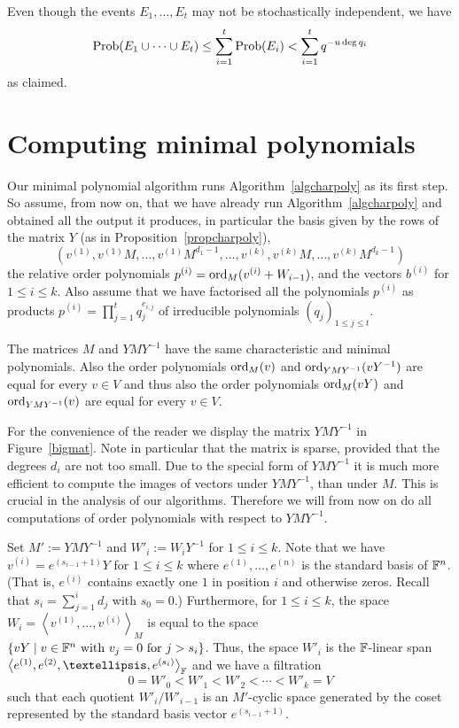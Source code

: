 Even though
the events $E_1,\ldots,E_t$ may not be stochastically independent, we have
\[ \mathrm{Prob}( E_1 \cup \cdots \cup E_t ) \le \sum_{i=1}^t \mathrm{Prob}(E_i)
   < \sum_{i=1}^t q^{-u\deg q_i} \]
as claimed.
\proofend

\section{Computing minimal polynomials}
\label{minpoly}

Our minimal polynomial algorithm runs Algorithm~\ref{algcharpoly} as its
first step. So assume, from now on,
that we have already run Algorithm~\ref{algcharpoly}
and obtained all the output it produces, in particular
the basis given by the rows of the matrix $Y$ (as in Proposition~\ref{propcharpoly}),
\[ 
(v^{(1)}, v^{(1)}M, \ldots, v^{(1)} M^{d_1-1}, \ldots, v^{(k)}, 
v^{(k)} M, \ldots, v^{(k)} M^{d_k-1}) 
\]
the relative order polynomials $p^{(i)} = \mathrm{ord}_M(v^{(i)}
+ W_{i-1})$, and the vectors $b^{(i)}$ for $1 \le i \le k$.
Also assume that we have factorised all the polynomials $p^{(i)}$
as products $p^{(i)} = \prod_{j=1}^t q_j^{e_{i,j}}$ of irreducible 
polynomials $(q_j)_{1 \le j \le t}$.

The matrices $M$ and $YMY^{-1}$ have the same characteristic
and minimal polynomials. Also the order polynomials $\mathrm{ord}_M(v)$ and
$\mathrm{ord}_{YMY^{-1}}(vY^{-1})$ are equal for every $v \in V$ and thus also
the order polynomials $\mathrm{ord}_M(vY)$ and $\mathrm{ord}_{YMY^{-1}}(v)$ are equal for every
$v \in V$.

For the convenience of the reader we display the matrix
$YMY^{-1}$ in Figure~\ref{bigmat}. Note in particular that the matrix is
sparse, provided that the degrees $d_i$ are not too small.
Due to the special form of $YMY^{-1}$ it is much more efficient to compute
the images of vectors under $YMY^{-1}$, than under $M$. 
This is crucial in the analysis of our algorithms. 
Therefore we will from now on do all computations of order polynomials
with respect to $YMY^{-1}$.

Set $M' := YMY^{-1}$ and $W'_i := W_i Y^{-1}$ for $1 \le i \le k$.
Note that we have $v^{(i)} = e^{(s_{i-1}+1)} Y$ for $1 \le i \le k$
where $e^{(1)}, \ldots, e^{(n)}$ is the standard basis of $\mathbb{F}^n$. (That is,  
 $e^{(i)}$ contains exactly one $1$ in position $i$ and otherwise zeros. Recall
that $s_i = \sum_{j=1}^i d_j$ with $s_0 = 0$.) Furthermore, for $1 \le i \le k$,
the space $W_i = \left< v^{(1)}, \ldots, v^{(i)} \right>_M$ is equal to the space
$\{ vY \mid v \in \mathbb{F}^n \mbox{ with } v_j = 0 \mbox{ for } j > s_i \}$. 
Thus, the space $W'_i$ is the $\mathbb{F}$-linear
span $\left< e^{(1)}, e^{(2)}, \ldots, e^{(s_i)}\right>_\F$ and we have a
filtration
\[ 0 = W'_0 < W'_1 < W'_2 < \cdots < W'_k = V \]
such that each quotient $W'_i/W'_{i-1}$ is an $M'$-cyclic space generated 
by the coset represented by the standard basis vector $e^{(s_{i-1}+1)}$.

